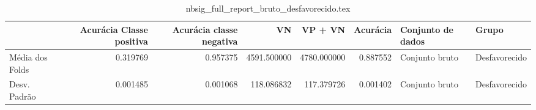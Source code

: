 \begin{table}
\centering
\caption{nbsig_full_report_bruto_desfavorecido.tex}
\label{nbsig_full_report_bruto_desfavorecido.tex}
\begin{tabular}{lrrrrrll}
\toprule
{}              &  Acurácia Classe positiva &  Acurácia classe negativa &          VN  &     VP + VN  &  Acurácia & Conjunto de dados &          Grupo \\
\midrule
Média dos Folds &                  0.319769 &                  0.957375 &  4591.500000 &  4780.000000 &  0.887552 &    Conjunto bruto &  Desfavorecido \\
Desv. Padrão    &                  0.001485 &                  0.001068 &   118.086832 &   117.379726 &  0.001402 &    Conjunto bruto &  Desfavorecido \\
\bottomrule
\end{tabular}
\end{table}

